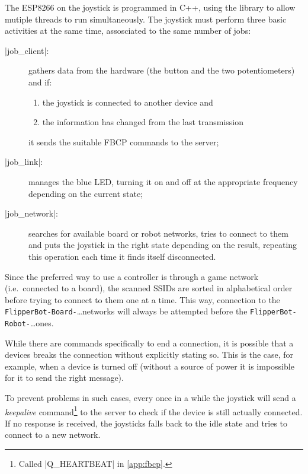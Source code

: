 \beforelist* The ESP8266 on the joystick is programmed in C++, using the
\ScheMo{} library to allow mutiple threads to run simultaneously.
The joystick must perform three basic activities at the same time, assosciated
to the same number of jobs:
\begin{description}
  \item[\Code|job\_client|:] gathers data from the hardware (the button and the
    two potentiometers) and if:
    \begin{enumerate}[itemjoin={,}, itemjoin*={{ and }}]
      \item the joystick is connected to another device and
      \item the information has changed from the last transmission
    \end{enumerate}
    it sends the suitable FBCP commands to the server;
  \item[\Code|job\_link|:] manages the blue LED, turning it on and off at the
    appropriate frequency depending on the current state;
  \item[\Code|job\_network|:] searches for available board or robot networks,
    tries to connect to them and puts the joystick in the right state
    depending on the result, repeating this operation each time it finds itself
    disconnected.
\end{description}
\afterlist*
Since the preferred way to use a controller is through a game network
(i.e.\ connected to a board), the scanned SSIDs are sorted in alphabetical
order before trying to connect to them one at a time.
This way, connection to the \Verb|FlipperBot-Board-|\ldots networks will always
be attempted before the \Verb|FlipperBot-Robot-|\ldots ones.

While there are commands specifically to end a connection, it is possible that
a devices breaks the connection without explicitly stating so.
This is the case, for example, when a device is turned off (without a source of
power it is impossible for it to send the right message).

To prevent problems in such cases, every once in a while the joystick will send
a \emph{keepalive} command\footnote{Called \Code|Q\_HEARTBEAT| in
\autoref{app:fbcp}.} to the server to check if the device is still actually
connected.
If no response is received, the joysticks falls back to the idle state and tries
to connect to a new network.
